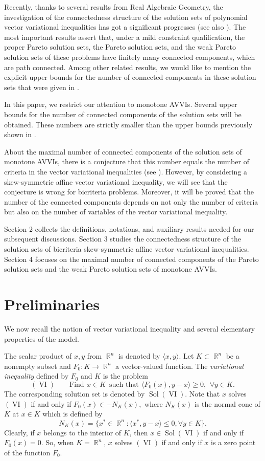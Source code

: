 \documentclass[smallextended,envcountsect]{svjour3}       %
\DeclareMathOperator{\Sol}{Sol}
\DeclareMathOperator{\VI}{VI}
\DeclareMathOperator{\R}{\mathbb{R}}
\begin{document}
Recently, thanks to several results from Real Algebraic Geometry, the investigation of the connectedness structure of the solution sets of polynomial vector variational inequalities has got a significant progresses \cite{HYY2015a,HYY2015b} (see also \cite{Hieu16}). The most important results assert that, under a mild constraint qualification, the proper Pareto solution sets, the Pareto solution sets, and the weak Pareto solution sets of these problems have finitely many connected components, which are path connected. Among other related results, we would like to mention the explicit upper bounds for the number of connected components in these solution sets that were given in \cite{Hieu16}. 

In this paper, we restrict our attention to monotone AVVIs. Several upper bounds for the number of connected components of the solution sets will be obtained. These numbers are strictly smaller than the upper bounds previously shown in \cite[Theorem 3.3]{Hieu16}.

About the maximal number of connected components of the solution sets of monotone AVVIs, there is a conjecture that this number equals the number of criteria in the vector variational inequalities (see \cite[Question 2]{YY2011}). However, by considering a skew-symmetric affine vector variational inequality, we will see that the conjecture  is wrong for bicriteria problems. Moreover, it will be proved that the number of the connected components depends on not only the number of criteria but also on the number of variables of the vector variational inequality. 

Section 2 collects the definitions, notations, and auxiliary results needed for our subsequent discussions. Section 3 studies the connectedness structure of the solution sets of bicriteria skew-symmetric affine vector variational inequalities. Section 4 focuses on the maximal number of connected components of the Pareto solution sets and the weak Pareto solution sets of monotone AVVIs.

\section{Preliminaries}
We now recall the notion of vector variational inequality and several elementary properties of the model.

The scalar product of $x, y$ from $\R^n$ is denoted by $\langle x,y\rangle$. Let $K\subset\R^n$ be a nonempty subset and $F_0: K\to\R^n$ a vector-valued function. The \textit{variational inequality} defined by $F_0$ and $K$ is the problem
$${(\VI)} \qquad {\text{Find}}\ \, x\in K \ \; \text{such that}\ \, \langle F_0(x),y-x\rangle\geq 0,\ \, \forall y\in K.$$
The corresponding solution set is denoted by $\Sol(\VI)$.
 Note that $x$ solves $(\VI)$ if and only if
$F_0(x)\in -N_K(x),$
where $N_K(x)$ is the normal cone  of $K$ at $x\in K$  which is defined by 
$$
N_K(x)=\{x^*\in \R^n:\langle x^*,y-x\rangle\leq 0, \forall y\in K\}.
$$
Clearly, if $x$ belongs to the interior of $K$, then $x\in\Sol(\VI)$ if and only if $F_0(x)=0$. So, when $K=\R^n$, $x$ solves $(\VI)$  if and only if $x$ is a zero point of the function $F_0$.
\end{document}
